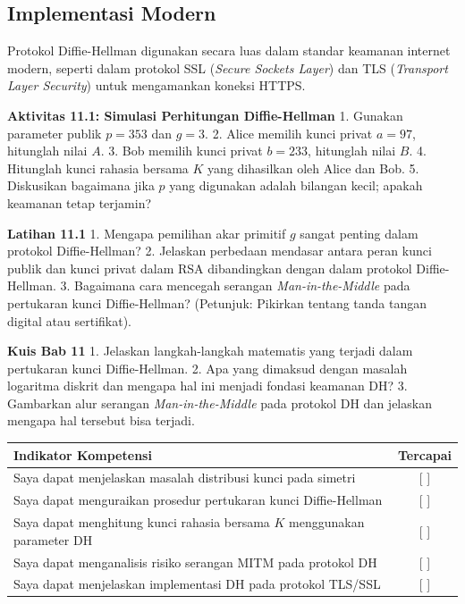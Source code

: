 \documentclass[../main.tex]{subfiles}
\begin{document}
\subsection{Implementasi Modern}
Protokol Diffie-Hellman digunakan secara luas dalam standar keamanan internet modern, seperti dalam protokol SSL (\textit{Secure Sockets Layer}) dan TLS (\textit{Transport Layer Security}) untuk mengamankan koneksi HTTPS.

\begin{obeactivity}
\textbf{Aktivitas 11.1: Simulasi Perhitungan Diffie-Hellman}
1. Gunakan parameter publik $p = 353$ dan $g = 3$.
2. Alice memilih kunci privat $a = 97$, hitunglah nilai $A$.
3. Bob memilih kunci privat $b = 233$, hitunglah nilai $B$.
4. Hitunglah kunci rahasia bersama $K$ yang dihasilkan oleh Alice dan Bob.
5. Diskusikan bagaimana jika $p$ yang digunakan adalah bilangan kecil; apakah keamanan tetap terjamin?
\end{obeactivity}

\begin{obereflection}
\textbf{Latihan 11.1}
1. Mengapa pemilihan akar primitif $g$ sangat penting dalam protokol Diffie-Hellman?
2. Jelaskan perbedaan mendasar antara peran kunci publik dan kunci privat dalam RSA dibandingkan dengan dalam protokol Diffie-Hellman.
3. Bagaimana cara mencegah serangan \textit{Man-in-the-Middle} pada pertukaran kunci Diffie-Hellman? (Petunjuk: Pikirkan tentang tanda tangan digital atau sertifikat).
\end{obereflection}

\begin{obeassessment}
\textbf{Kuis Bab 11}
1. Jelaskan langkah-langkah matematis yang terjadi dalam pertukaran kunci Diffie-Hellman.
2. Apa yang dimaksud dengan masalah logaritma diskrit dan mengapa hal ini menjadi fondasi keamanan DH?
3. Gambarkan alur serangan \textit{Man-in-the-Middle} pada protokol DH dan jelaskan mengapa hal tersebut bisa terjadi.
\end{obeassessment}

\begin{competencychecklist}
\begin{tabularx}{\linewidth}{|X|c|}
\hline
Indikator Kompetensi & Tercapai \\
\hline
Saya dapat menjelaskan masalah distribusi kunci pada simetri & [ ] \\
\hline
Saya dapat menguraikan prosedur pertukaran kunci Diffie-Hellman & [ ] \\
\hline
Saya dapat menghitung kunci rahasia bersama $K$ menggunakan parameter DH & [ ] \\
\hline
Saya dapat menganalisis risiko serangan MITM pada protokol DH & [ ] \\
\hline
Saya dapat menjelaskan implementasi DH pada protokol TLS/SSL & [ ] \\
\hline
\end{tabularx}
\end{competencychecklist}
\end{document}
